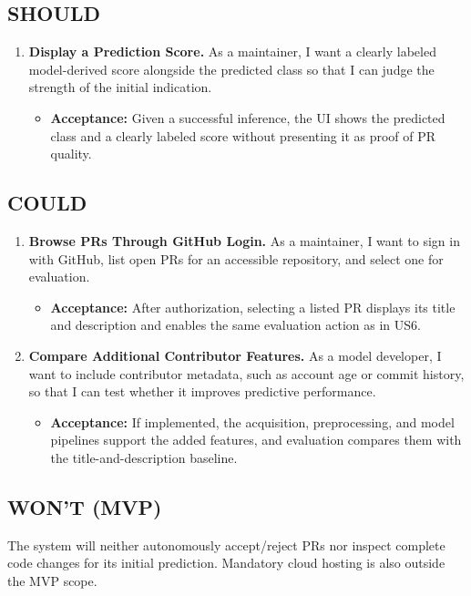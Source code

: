 \documentclass[conference,a4paper,flushend]{cs-techrep}
\begin{document}
\subsection{SHOULD}
\begin{enumerate}[label={US\arabic*},resume=stories]
\item \textbf{Display a Prediction Score.} As a maintainer, I want a clearly labeled model-derived score alongside the predicted class so that I can judge the strength of the initial indication.
  \begin{itemize}
    \item \textbf{Acceptance:} Given a successful inference, the UI shows the predicted class and a clearly labeled score without presenting it as proof of PR quality.
  \end{itemize}
\end{enumerate}

\subsection{COULD}
\begin{enumerate}[label={US\arabic*},resume=stories]
\item \textbf{Browse PRs Through GitHub Login.} As a maintainer, I want to sign in with GitHub, list open PRs for an accessible repository, and select one for evaluation.
  \begin{itemize}
    \item \textbf{Acceptance:} After authorization, selecting a listed PR displays its title and description and enables the same evaluation action as in US6.
  \end{itemize}
\item \textbf{Compare Additional Contributor Features.} As a model developer, I want to include contributor metadata, such as account age or commit history, so that I can test whether it improves predictive performance.
  \begin{itemize}
    \item \textbf{Acceptance:} If implemented, the acquisition, preprocessing, and model pipelines support the added features, and evaluation compares them with the title-and-description baseline.
  \end{itemize}
\end{enumerate}

\subsection{WON'T (MVP)}
The system will neither autonomously accept/reject PRs nor inspect complete code changes for its initial prediction. Mandatory cloud hosting is also outside the MVP scope.
\end{document}
